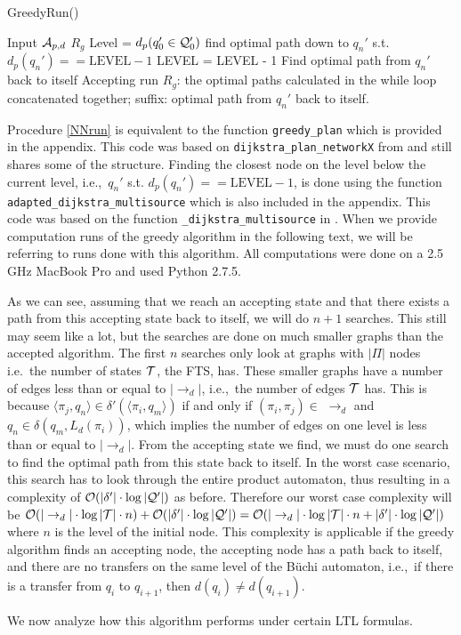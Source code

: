 \begin{algorithm}
\caption{GreedyRun()}\label{NNrun}
\begin{algorithmic}[1]
\Require Input $\mathcal{A}_{p,d}$
\Ensure $R_{g}$
\State Level = $d_p(q_0' \in \mathcal{Q}_0')$
\State find optimal path down to $q_n'$ s.t. $d_p(q_n')==\text{LEVEL}-1$ %
\State	LEVEL = LEVEL - 1
\EndWhile
\State Find optimal path from $q_n'$ back to itself
\State Accepting run $R_g$: the optimal paths calculated in the while loop concatenated together; suffix: optimal path from $q_n'$ back to itself.
\end{algorithmic}
\end{algorithm}

Procedure \ref{NNrun} is equivalent to the function \texttt{greedy\_plan} which is provided in the appendix. This code was based on \texttt{dijkstra\_plan\_networkX} from \cite{pMasGit} and still shares some of the structure. Finding the closest node on the level below the current level, i.e.,\ $q_n'$ s.t. $d_p(q_n')==\text{LEVEL}-1$, is done using the function \texttt{adapted\_dijkstra\_multisource} which is also included in the appendix. This code was based on the function  \texttt{\_dijkstra\_multisource} in \cite{schult08}. When we provide computation runs of the greedy algorithm in the following text, we will be referring to runs done with this algorithm. All computations were done on a 2.5 GHz MacBook Pro and used Python 2.7.5.

As we can see, assuming that we reach an accepting state and that there exists a path from this accepting state back to itself, we will do $n+1$ searches. This still may seem like a lot, but the searches are done on much smaller graphs than the accepted algorithm. The first $n$ searches only look at graphs with $|\Pi|$ nodes i.e.\ the number of states $\mathcal{T}$, the FTS, has. These smaller graphs have a number of edges less than or equal to $|\rightarrow_d|$, i.e.,\ the number of edges $\mathcal{T}$ has. This is because $\langle \pi_j, q_n \rangle \in \delta' (\langle \pi_i, q_m \rangle )$ if and only if $(\pi_i , \pi_j ) \in$ $\rightarrow_d$ and $q_n \in \delta (q_m, L_d(\pi_i))$, which implies the number of edges on one level is less than or equal to $|\rightarrow_d|$. From the accepting state we find, we must do one search to find the optimal path from this state back to itself. In the worst case scenario, this search has to look through the entire product automaton, thus resulting in a complexity of $\mathcal{O}(|\delta'| \cdot \log|\mathcal{Q}'|)$ as before. Therefore our worst case complexity will be $\mathcal{O}(|\rightarrow_d|\cdot \log |\mathcal{T}| \cdot n) + \mathcal{O}(|\delta'| \cdot \log|\mathcal{Q}'|) = \mathcal{O}(|\rightarrow_d|\cdot \log |\mathcal{T}| \cdot n + |\delta'| \cdot \log|\mathcal{Q}'|)$ where $n$ is the level of the initial node. This complexity is applicable if the greedy algorithm finds an accepting node, the accepting node has a path back to itself, and there are no transfers on the same level of the B\"uchi automaton, i.e.,\ if there is a transfer from $q_i$ to $q_{i+1}$, then $d(q_i) \neq d(q_{i+1})$. 

We now analyze how this algorithm performs under certain LTL formulas. 